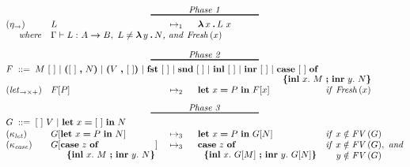 \begin{figure*}[h]
\[\uncolored
\begin{array}[t]{@{}lllll@{}}
\multicolumn{5}{@{}c@{}}{\txt{Phase 1}}\\[-9pt]
\multicolumn{5}{@{}c@{}}{\rule{120pt}{1pt}}\\[1pt]
(\eta_{\rightarrow})
& L
& \ \rewrite{}{1}{}\ \
& \expabs{x}{A}{\expapp{L}{x}}
& %
\\[0pt]
\multicolumn{5}{@{}l@{}}{\txt{\ \ \ \ where\ \ \ }\env \vdash \typing{L}{\typarr{A}{B}},\ L \neq \expabs{y}{A}{N}\txt{, and }\fresh{x}}
\\[10pt]

\multicolumn{5}{@{}c@{}}{\txt{Phase 2}}\\[-9pt]
\multicolumn{5}{@{}c@{}}{\rule{120pt}{1pt}}\\[1pt]

\multicolumn{5}{@{}l@{}}{F \mathbin{\ ::=\ }
    \expapp{M}{\hole}\
 |\ \expprd{\hole}{N}\
 |\ \expprd{V}{\hole}\
 |\ \expfst{\hole}\
 |\ \expsnd{\hole}\
 |\ \explft{\hole}{B}\
 |\ \exprgt{A}{\hole}\
 |\ \expcasind{\hole}{x}{M}{y}{N}}\\[1pt]

(\txt{let}_{\rightarrow\times+})
& F[\nv]
& \ \rewrite{}{2}{}\ \
& \expshr{x}{\nv}{F[x]}
& \cnd{%
       \fresh{x}} \\[8pt]

\multicolumn{5}{@{}c@{}}{\txt{Phase 3}}\\[-9pt]
\multicolumn{5}{@{}c@{}}{\rule{120pt}{1pt}}\\[1pt]

\multicolumn{5}{@{}l@{}}{G \mathbin{\ ::=\ }
    \expapp{\hole}{V}\
 |\ \expshr{x}{\hole}{N}}\\[1pt]

(\kappa_{\txt{let}})
& G[\expshr{x}{\nv}{N}]
& \ \rewrite{}{3}{}\ \
& \expshr{x}{\nv}{G[N]}
& \cnd{x \notin \fv{G}}\\[0pt]

(\kappa_{\txt{case}})
& G[\expcasind{z}{x}{M}{y}{N}]
& \ \rewrite{}{3}{}\ \
& \expcasind{z}{x}{G[M]}{y}{G[N]}
& \cnd{x \notin \fv{G},\ \txt{and}\\\ \ \ \, y \notin \fv{G}} \\[20pt]



\end{array}\]
\end{figure*}
